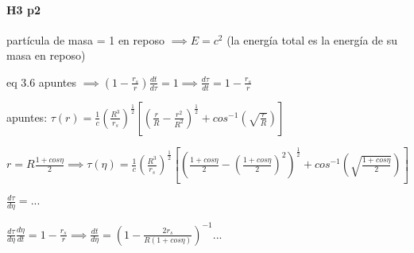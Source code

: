 \documentclass[10pt]{book}
\begin{document}
\paragraph{H3 p2}

partícula de masa = 1 en reposo $\implies E = c^2$  (la energía total es la energía de su masa en reposo)

eq 3.6 apuntes $\implies (1-\frac{r_s}{r}) \frac{dt}{d\tau} = 1 \implies \frac{d\tau}{dt} = 1-\frac{r_s}{r}  $

apuntes: $\tau(r) = \frac{1}{c} (\frac{R^3}{r_s})^{\frac{1}{2}} [(\frac{r}{R} -\frac{r^2}{R^2})^{\frac{1}{2}} + cos^{-1}(\sqrt{\frac{r}{R}}) ] $

$r = R \frac{1+cos \eta}{2} \implies \tau(\eta) = \frac{1}{c} (\frac{R^3}{r_s})^{\frac{1}{2}} [(\frac{1+cos \eta}{2} -(\frac{1+cos \eta}{2}) ^2)^{\frac{1}{2}} + cos^{-1}(\sqrt{\frac{1+cos \eta}{2}}) ] $

$\frac{d\tau}{d\eta} = ...$

$\frac{d\tau}{d\eta} \frac{d\eta}{dt} = 1-\frac{r_s}{r} \implies \frac{dt}{d\eta} =  (1-\frac{2 r_s}{R(1+cos \eta)})^{-1} ... $
\end{document}
